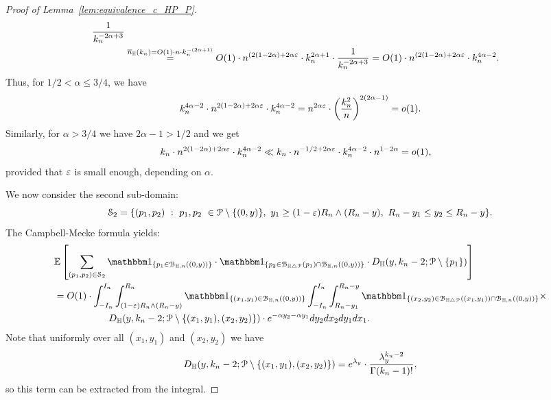 \begin{proof}[Proof of Lemma~\ref{lem:equivalence_c_HP_P}]
\begin{equation*}
\begin{split}
\frac{1}{k_n^{-2\alpha +3}} \\
&\stackrel{\overline{n}_{\mathbb{H}}(k_n) = O(1) \cdot n \cdot k_n^{-(2\alpha +1)}}{=}
O(1) \cdot n^{(2(1-2\alpha) + 2\alpha \varepsilon} \cdot k_n^{2\alpha +1} \cdot 
\frac{1}{k_n^{-2\alpha +3}} = O(1) \cdot n^{(2(1-2\alpha) + 2\alpha \varepsilon} \cdot k_n^{4\alpha -2}.
\end{split}
\end{equation*}
Thus, for $1/2 < \alpha \leq3/4$, we have 
\begin{equation*}
\begin{split}
k_n^{4 \alpha -2} \cdot  n^{2(1-2\alpha) + 2\alpha \varepsilon} \cdot k_n^{4\alpha -2} = 
n^{2\alpha \varepsilon} \cdot \left( \frac{k_n^2}{n} \right)^{2(2\alpha -1)} = o(1). 
\end{split}
\end{equation*}
Similarly, for $\alpha > 3/4$ we have $2\alpha -1 > 1/2$ and we get
\begin{equation*} 
\begin{split}
&k_n \cdot n^{2(1-2\alpha) + 2\alpha \varepsilon} \cdot k_n^{4\alpha -2}
\ll k_n \cdot n^{-1/2 + 2\alpha \varepsilon}  \cdot k_n^{4\alpha -2} \cdot n^{1-2\alpha}  = o(1),
\end{split}
\end{equation*}
provided that $\varepsilon$ is small enough, depending on $\alpha$. 


We now consider the second sub-domain:
$$\mathcal{S}_2 = \{(p_1, p_2) \ : \  p_1,p_2 \ \in \Pcal \setminus \{(0,y) \}, \ y_1 \geq (1-\eps) R_n \wedge (R_n-y), \ 
R_n -y_1 \leq y_2 \leq R_n -y \}. $$
The Campbell-Mecke formula yields: 
\begin{equation*}
\begin{split} 
&\Exp { \sum_{(p_1,p_2)  \in \mathcal{S}_2} 
\ind{p_1 \in \BallHyp{(0,y)}} \cdot \ind{p_2 \in \BallSym{p_1} \cap \BallHyp{(0,y)}}
\cdot D_\H (y,k_n-2;\Pcal \setminus \{ p_1\})} \\
& 
=O(1) \cdot \int_{-I_n}^{I_n} \int_{(1-\eps) R_n \wedge (R_n-y)}^{R_n} \ind{(x_1,y_1) \in \BallHyp{(0,y)}}
\int_{-I_n}^{I_n} \int_{R_n - y_1}^{R_n-y} 
\ind{(x_2,y_2) \in \BallSym{(x_1,y_1)} \cap \BallHyp{(0,y)}} \times \\ 
& \hspace{2cm}  D_\H (y,k_n-2;\Pcal \setminus \{ (x_1,y_1), (x_2,y_2)\}) \cdot
e^{-\alpha y_2 - \alpha y_1} dy_2 dx_2 dy_1 dx_1.
\end{split}
\end{equation*}
Note that uniformly over all $(x_1,y_1)$ and $(x_2,y_2)$ we have 
$$ D_{\mathbb{H}} (y,k_n-2;{\mathcal P} \setminus \{ (x_1,y_1), (x_2,y_2)\})   = e^{\lambda_y} \cdot \frac{\lambda_y^{k_n-2}}{\Gamma (k_n-1)!}, $$
so this term can be extracted from the integral. 


\end{proof}
